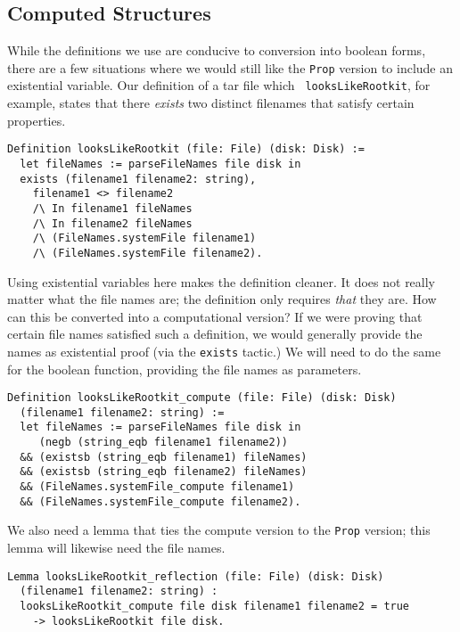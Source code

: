 \documentclass[nocopyrightspace]{sigplanconf}
\begin{document}
\subsection{Computed Structures}

While the definitions we use are conducive to conversion into boolean forms,
there are a few situations where we would still like the {\tt Prop} version to
include an existential variable. Our definition of a tar file which {\tt
looksLikeRootkit}, for example, states that there {\em exists} two distinct
filenames that satisfy certain properties.

\begin{lstlisting}
Definition looksLikeRootkit (file: File) (disk: Disk) :=
  let fileNames := parseFileNames file disk in
  exists (filename1 filename2: string),
    filename1 <> filename2
    /\ In filename1 fileNames
    /\ In filename2 fileNames
    /\ (FileNames.systemFile filename1)
    /\ (FileNames.systemFile filename2).
\end{lstlisting}

Using existential variables here makes the definition cleaner. It does not
really matter what the file names are; the definition only requires {\em that}
they are. How can this be converted into a computational version? If we were
proving that certain file names satisfied such a definition, we would
generally provide the names as existential proof (via the {\tt exists}
tactic.) We will need to do the same for the boolean function, providing the
file names as parameters.

\begin{lstlisting}
Definition looksLikeRootkit_compute (file: File) (disk: Disk)
  (filename1 filename2: string) :=
  let fileNames := parseFileNames file disk in
     (negb (string_eqb filename1 filename2))
  && (existsb (string_eqb filename1) fileNames)
  && (existsb (string_eqb filename2) fileNames)
  && (FileNames.systemFile_compute filename1)
  && (FileNames.systemFile_compute filename2).
\end{lstlisting}

We also need a lemma that ties the compute version to the {\tt Prop} version;
this lemma will likewise need the file names.

\begin{lstlisting}
Lemma looksLikeRootkit_reflection (file: File) (disk: Disk)
  (filename1 filename2: string) :
  looksLikeRootkit_compute file disk filename1 filename2 = true
    -> looksLikeRootkit file disk.
\end{lstlisting}
\end{document}
